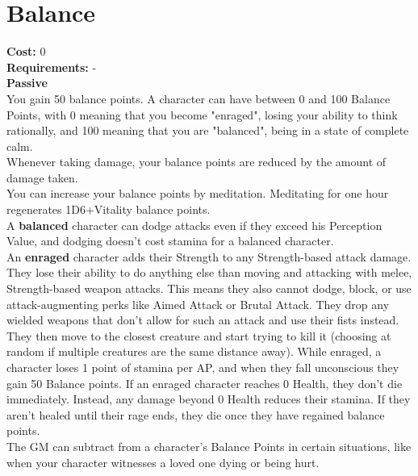 \section*{Balance}
\textbf{Cost:} 0\\
\textbf{Requirements:} -\\
\textbf{Passive}\\
You gain 50 balance points. A character can have between 0 and 100 Balance Points, with 0 meaning that you become "enraged", losing your ability to think rationally, and 100 meaning that you are "balanced", being in a state of complete calm.\\
Whenever taking damage, your balance points are reduced by the amount of damage taken.\\
You can increase your balance points by meditation. Meditating for one hour regenerates 1D6+Vitality balance points.\\
A \textbf{balanced} character can dodge attacks even if they exceed his Perception Value, and dodging doesn't cost stamina for a balanced character.\\
An \textbf{enraged} character adds their Strength to any Strength-based attack damage. They lose their ability to do anything else than moving and attacking with melee, Strength-based weapon attacks. This means they also cannot dodge, block, or use attack-augmenting perks like Aimed Attack or Brutal Attack. They drop any wielded weapons that don't allow for such an attack and use their fists instead. They then move to the closest creature and start trying to kill it (choosing at random if multiple creatures are the same distance away). While enraged, a character loses 1 point of stamina per AP, and when they fall unconscious they gain 50 Balance points. If an enraged character reaches 0 Health, they don't die immediately. Instead, any damage beyond 0 Health reduces their stamina. If they aren't healed until their rage ends, they die once they have regained balance points.\\
The GM can subtract from a character's Balance Points in certain situations, like when your character witnesses a loved one dying or being hurt.